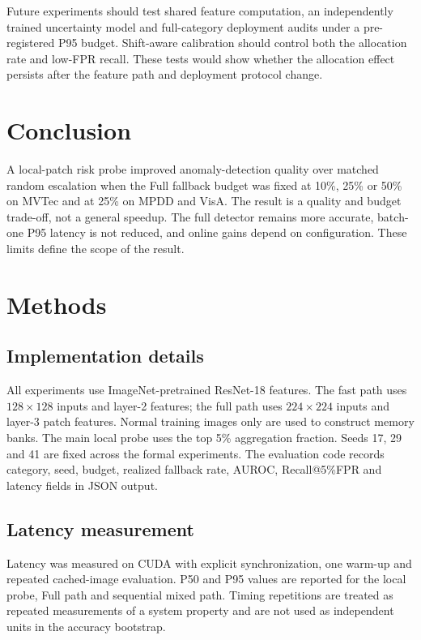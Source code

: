 \documentclass[pdflatex,sn-vancouver-num]{sn-jnl}
\begin{document}
Future experiments should test shared feature computation, an independently trained uncertainty model and full-category deployment audits under a pre-registered P95 budget. Shift-aware calibration should control both the allocation rate and low-FPR recall. These tests would show whether the allocation effect persists after the feature path and deployment protocol change.

\section{Conclusion}\label{sec:conclusion}

A local-patch risk probe improved anomaly-detection quality over matched random escalation when the Full fallback budget was fixed at 10\%, 25\% or 50\% on MVTec and at 25\% on MPDD and VisA. The result is a quality and budget trade-off, not a general speedup. The full detector remains more accurate, batch-one P95 latency is not reduced, and online gains depend on configuration. These limits define the scope of the result.

\section{Methods}\label{sec:methods}

\subsection{Implementation details}
All experiments use ImageNet-pretrained ResNet-18 features. The fast path uses $128\times128$ inputs and layer-2 features; the full path uses $224\times224$ inputs and layer-3 patch features. Normal training images only are used to construct memory banks. The main local probe uses the top 5\% aggregation fraction. Seeds 17, 29 and 41 are fixed across the formal experiments. The evaluation code records category, seed, budget, realized fallback rate, AUROC, Recall@5\%FPR and latency fields in JSON output.

\subsection{Latency measurement}
Latency was measured on CUDA with explicit synchronization, one warm-up and repeated cached-image evaluation. P50 and P95 values are reported for the local probe, Full path and sequential mixed path. Timing repetitions are treated as repeated measurements of a system property and are not used as independent units in the accuracy bootstrap.
\end{document}
